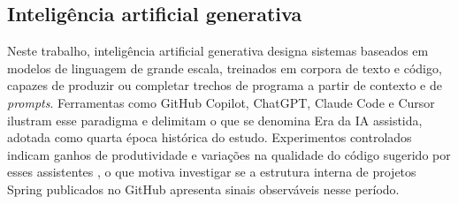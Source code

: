 \subsection{Inteligência artificial generativa}
\label{subsec:fund-ia}

Neste trabalho, inteligência artificial generativa designa sistemas baseados em modelos de linguagem de grande escala, treinados em corpora de texto e código, capazes de produzir ou completar trechos de programa a partir de contexto e de \emph{prompts}. Ferramentas como GitHub Copilot, ChatGPT, Claude Code e Cursor ilustram esse paradigma e delimitam o que se denomina Era da IA assistida, adotada como quarta época histórica do estudo. Experimentos controlados indicam ganhos de produtividade e variações na qualidade do código sugerido por esses assistentes \cite{peng:23,dakhel:23}, o que motiva investigar se a estrutura interna de projetos Spring publicados no GitHub apresenta sinais observáveis nesse período.
